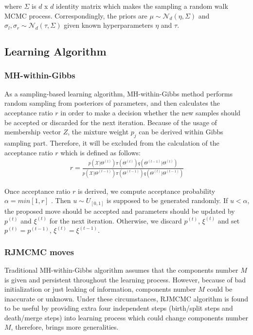 \documentclass[conference]{IEEEtran}
\begin{document}
where $\Sigma$ is $d$ x $d$ identity matrix which makes the sampling a random walk MCMC process. Correspondingly, the priors are $\mu \sim \mathcal{N}_d(\eta,\Sigma)$ and $\sigma_l, \sigma_r \sim \mathcal{N}_d(\tau,\Sigma)$ given known hyperparameters $\eta$ and $\tau$.

\subsection{Learning Algorithm}
\subsubsection*{MH-within-Gibbs}
As a sampling-based learning algorithm, MH-within-Gibbs method performs random sampling from posteriors of parameters, and then calculates the acceptance ratio $r$ in order to make a decision whether the new samples should be accepted or discarded for the next iteration. Because of the usage of membership vector $Z$, the mixture weight $p_j$ can be derived within Gibbs sampling part. Therefore, it will be excluded from the calculation of the acceptance ratio $r$ which is defined as follows:
\begin{align}
r = \frac{p(\mathcal{X}|\Theta^{(t)})\pi(\Theta^{(t)})q(\Theta^{(t-1)}|\Theta^{(t)})}{p(\mathcal{X}|\Theta^{(t-1)})\pi(\Theta^{(t-1)})q(\Theta^{(t)}|\Theta^{(t-1)})}
\label{eq:r}
\end{align}

Once acceptance ratio $r$ is derived, we compute acceptance probability $\alpha = min[1,r]$ \cite{Luengo2013}. Then $u \sim U_{[0,1]}$ is supposed to be generated randomly. If $u < \alpha$, the proposed move should be accepted and parameters should be updated by $p^{(t)}$ and $\xi^{(t)}$ for the next iteration. Otherwise, we discard $p^{(t)}$, $\xi^{(t)}$ and set $p^{(t)} = p^{(t-1)}$, $\xi^{(t)} = \xi^{(t-1)}$. 

\subsubsection*{RJMCMC moves}
Traditional MH-within-Gibbs algorithm assumes that the components number $M$ is given and persistent throughout the learning process. However, because of bad initialization or just leaking of information, components number $M$ could be inaccurate or unknown. Under these circumstances, RJMCMC algorithm is found to be useful by providing extra four independent steps (birth/split steps and death/merge steps) into learning process which could change components number $M$, therefore, brings more generalities.
\end{document}
